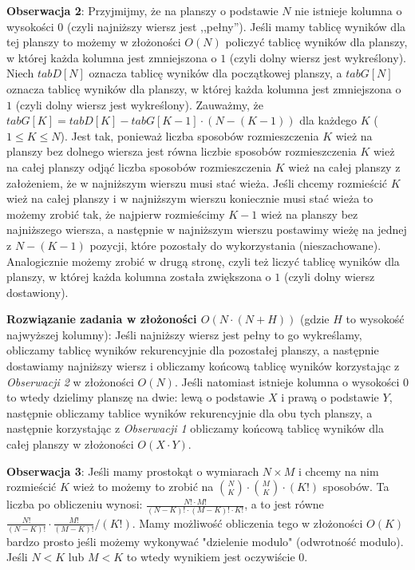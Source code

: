 \documentclass[opr,utf8]{sinol}
\newcounter{wn}
\begin{document}
\begin{tasktext}
\textbf{Obserwacja 2}: Przyjmijmy, że na planszy o podstawie $N$ nie istnieje kolumna o wysokości $0$ (czyli najniższy wiersz jest ,,pełny''). Jeśli mamy tablicę wyników dla tej planszy to możemy w złożoności $O(N)$ policzyć tablicę wyników dla planszy, w której każda kolumna jest zmniejszona o $1$ (czyli dolny wiersz jest wykreślony). Niech $tabD[N]$ oznacza tablicę wyników dla początkowej planszy, a $tabG[N]$ oznacza tablicę wyników dla planszy, w której każda kolumna jest zmniejszona o $1$ (czyli dolny wiersz jest wykreślony). Zauważmy, że $tabG[K] = tabD[K] - tabG[K - 1]  \cdot  (N - (K - 1))$ dla każdego $K$ ($1 \leq K \leq N$). Jest tak, ponieważ liczba sposobów rozmieszczenia $K$ wież na planszy bez dolnego wiersza jest równa liczbie sposobów rozmieszczenia $K$ wież na całej planszy odjąć liczba sposobów rozmieszczenia $K$ wież na całej planszy z założeniem, że w najniższym wierszu musi stać wieża. Jeśli chcemy rozmieścić $K$ wież na całej planszy i w najniższym wierszu koniecznie musi stać wieża to możemy zrobić tak, że najpierw rozmieścimy $K-1$ wież na planszy bez najniższego wiersza, a następnie w najniższym wierszu postawimy wieżę na jednej z $N-(K-1)$ pozycji, które pozostały do wykorzystania (nieszachowane). Analogicznie możemy zrobić w drugą stronę, czyli też liczyć tablicę wyników dla planszy, w której każda kolumna została zwiększona o $1$ (czyli dolny wiersz dostawiony).

\textbf{Rozwiązanie zadania w złożoności $O(N \cdot (N+H))$} (gdzie $H$ to wysokość najwyższej kolumny): Jeśli najniższy wiersz jest pełny to go wykreślamy, obliczamy tablicę wyników rekurencyjnie dla pozostałej planszy, a następnie dostawiamy najniższy wiersz i obliczamy końcową tablicę wyników korzystając z \textit{Obserwacji 2} w złożoności $O(N)$. Jeśli natomiast istnieje kolumna o wysokości $0$ to wtedy dzielimy planszę na dwie: lewą o podstawie $X$ i prawą o podstawie $Y$, następnie obliczamy tablice wyników rekurencyjnie dla obu tych planszy, a następnie korzystając z \textit{Obserwacji 1} obliczamy końcową tablicę wyników dla całej planszy w złożoności $O(X \cdot Y)$.

\textbf{Obserwacja 3}: Jeśli mamy prostokąt o wymiarach $N \times M$ i chcemy na nim rozmieścić $K$ wież to możemy to zrobić na $\binom{N}{K} \cdot \binom{M}{K} \cdot (K!)$ sposobów. Ta liczba po obliczeniu wynosi: $\frac{N! \cdot M!}{(N-K)! \cdot (M-K)! \cdot K!}$, a to jest równe $ \frac{N!}{(N-K)!} \cdot \frac{M!}{(M-K)!} / (K!)$. Mamy możliwość obliczenia tego w złożoności $O(K)$ bardzo prosto jeśli możemy wykonywać "dzielenie modulo" (odwrotność modulo). Jeśli $N < K$ lub $M < K$ to wtedy wynikiem jest oczywiście $0$.


\end{tasktext}
\end{document}
